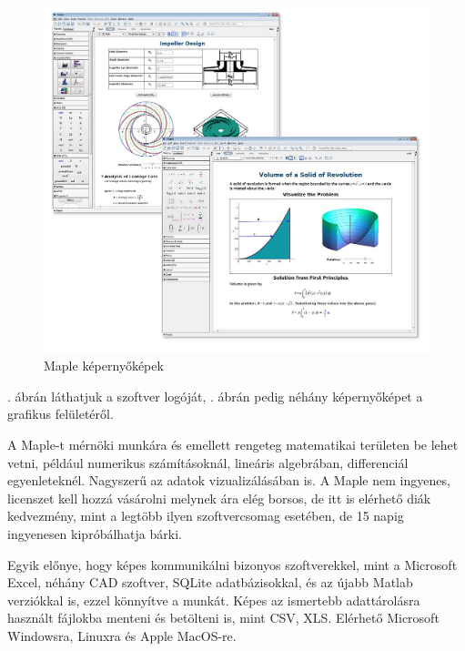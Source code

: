 \begin{figure}[h!]
\centering
\includegraphics[width=\textwidth]{img/Maple_screenshots.jpg}
\caption[Maple]{Maple képernyőképek\footnotemark}
\label{fig:maple-screenshots}
\end{figure}

. ábrán láthatjuk a szoftver logóját, . ábrán pedig néhány képernyőképet a grafikus felületéről.

A Maple-t mérnöki munkára és emellett rengeteg matematikai területen be
lehet vetni, például numerikus számításoknál, lineáris algebrában,
differenciál egyenleteknél. Nagyszerű az adatok vizualizálásában is. A
Maple nem ingyenes, licenszet kell hozzá vásárolni melynek ára elég
borsos, de itt is elérhető diák kedvezmény, mint a legtöbb ilyen
szoftvercsomag esetében, de 15 napig ingyenesen kipróbálhatja bárki.

Egyik előnye, hogy képes kommunikálni bizonyos szoftverekkel, mint a
Microsoft Excel, néhány CAD szoftver, SQLite adatbázisokkal, és az újabb
Matlab verziókkal is, ezzel könnyítve a munkát. Képes az ismertebb
adattárolásra használt fájlokba menteni és betölteni is, mint CSV, XLS.
Elérhető Microsoft Windowsra, Linuxra és Apple MacOS-re.



